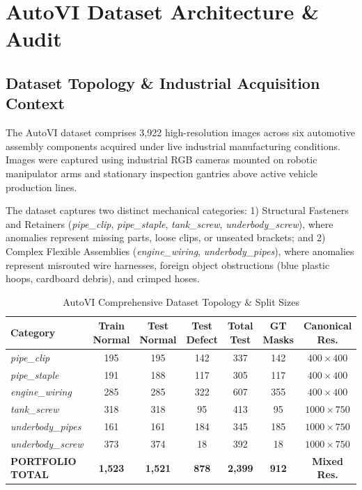 \documentclass[journal,twocolumn]{IEEEtran}
\begin{document}
\section{AutoVI Dataset Architecture \& Audit}
\subsection{Dataset Topology \& Industrial Acquisition Context}
The AutoVI dataset comprises 3,922 high-resolution images across six automotive assembly components acquired under live industrial manufacturing conditions. Images were captured using industrial RGB cameras mounted on robotic manipulator arms and stationary inspection gantries above active vehicle production lines.

The dataset captures two distinct mechanical categories: 1) Structural Fasteners and Retainers (\textit{pipe\_clip}, \textit{pipe\_staple}, \textit{tank\_screw}, \textit{underbody\_screw}), where anomalies represent missing parts, loose clips, or unseated brackets; and 2) Complex Flexible Assemblies (\textit{engine\_wiring}, \textit{underbody\_pipes}), where anomalies represent misrouted wire harnesses, foreign object obstructions (blue plastic hoops, cardboard debris), and crimped hoses.

\begin{table}[t]
\caption{AutoVI Comprehensive Dataset Topology \& Split Sizes}
\label{tab:dataset_topology}
\centering
\scriptsize
\begin{tabular}{lcccccc}
\toprule
\textbf{Category} & \textbf{Train Normal} & \textbf{Test Normal} & \textbf{Test Defect} & \textbf{Total Test} & \textbf{GT Masks} & \textbf{Canonical Res.} \\
\midrule
\textit{pipe\_clip} & 195 & 195 & 142 & 337 & 142 & $400 \times 400$ \\
\textit{pipe\_staple} & 191 & 188 & 117 & 305 & 117 & $400 \times 400$ \\
\textit{engine\_wiring} & 285 & 285 & 322 & 607 & 355 & $400 \times 400$ \\
\textit{tank\_screw} & 318 & 318 & 95 & 413 & 95 & $1000 \times 750$ \\
\textit{underbody\_pipes} & 161 & 161 & 184 & 345 & 185 & $1000 \times 750$ \\
\textit{underbody\_screw} & 373 & 374 & 18 & 392 & 18 & $1000 \times 750$ \\
\midrule
\textbf{PORTFOLIO TOTAL} & \textbf{1,523} & \textbf{1,521} & \textbf{878} & \textbf{2,399} & \textbf{912} & \textbf{Mixed Res.} \\
\bottomrule
\end{tabular}
\end{table}
\end{document}

